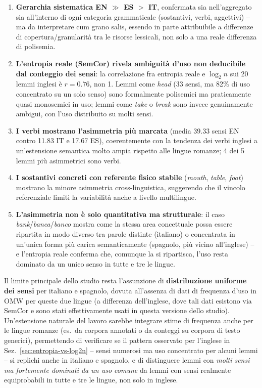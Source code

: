 \documentclass[12pt,a4paper]{article}
\begin{document}
\begin{enumerate}
  \item \textbf{Gerarchia sistematica EN $\gg$ ES $>$ IT}, confermata sia nell'aggregato sia all'interno di ogni categoria grammaticale (sostantivi, verbi, aggettivi) -- ma da interpretare cum grano salis, essendo in parte attribuibile a differenze di copertura/granularit\`a tra le risorse lessicali, non solo a una reale differenza di polisemia.
  \item \textbf{L'entropia reale (SemCor) rivela ambiguit\`a d'uso non deducibile dal conteggio dei sensi}: la correlazione fra entropia reale e $\log_2 n$ sui 20 lemmi inglesi \`e $r=0.76$, non 1. Lemmi come \textit{head} (33 sensi, ma 82\% di uso concentrato su un solo senso) sono formalmente polisemici ma praticamente quasi monosemici in uso; lemmi come \textit{take} o \textit{break} sono invece genuinamente ambigui, con l'uso distribuito su molti sensi.
  \item \textbf{I verbi mostrano l'asimmetria pi\`u marcata} (media 39.33 sensi EN contro 11.83 IT e 17.67 ES), coerentemente con la tendenza dei verbi inglesi a un'estensione semantica molto ampia rispetto alle lingue romanze; 4 dei 5 lemmi pi\`u asimmetrici sono verbi.
  \item \textbf{I sostantivi concreti con referente fisico stabile} (\textit{mouth}, \textit{table}, \textit{foot}) mostrano la minore asimmetria cross-linguistica, suggerendo che il vincolo referenziale limiti la variabilit\`a anche a livello multilingue.
  \item \textbf{L'asimmetria non \`e solo quantitativa ma strutturale}: il caso \textit{bank}/\textit{banca}/\textit{banco} mostra come la stessa area concettuale possa essere ripartita in modo diverso tra parole distinte (italiano) o concentrata in un'unica forma pi\`u carica semanticamente (spagnolo, pi\`u vicino all'inglese) -- e l'entropia reale conferma che, comunque la si ripartisca, l'uso resta dominato da un unico senso in tutte e tre le lingue.
\end{enumerate}

Il limite principale dello studio resta l'assunzione di \textbf{distribuzione uniforme dei sensi} per italiano e spagnolo, dovuta all'assenza di dati di frequenza d'uso in OMW per queste due lingue (a differenza dell'inglese, dove tali dati esistono via SemCor e sono stati effettivamente usati in questa versione dello studio). Un'estensione naturale del lavoro sarebbe integrare stime di frequenza anche per le lingue romanze (es.\ da corpora annotati o da conteggi su corpora di testo generici), permettendo di verificare se il pattern osservato per l'inglese in Sez.~\ref{sec:entropia-vs-log2n} -- sensi numerosi ma uso concentrato per alcuni lemmi -- si replichi anche in italiano e spagnolo, e di distinguere lemmi con \emph{molti sensi ma fortemente dominati da un uso comune} da lemmi con sensi realmente equiprobabili in tutte e tre le lingue, non solo in inglese.
\end{document}
